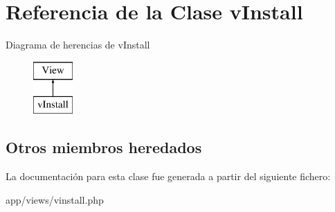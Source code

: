 \hypertarget{classv_install}{}\section{Referencia de la Clase v\+Install}
\label{classv_install}
Diagrama de herencias de v\+Install\begin{figure}[H]
\begin{center}
\leavevmode
\includegraphics[height=2.000000cm]{classv_install}
\end{center}
\end{figure}
\subsection*{Otros miembros heredados}


La documentación para esta clase fue generada a partir del siguiente fichero\+:\begin{DoxyCompactItemize}
\item 
app/views/vinstall.\+php\end{DoxyCompactItemize}
